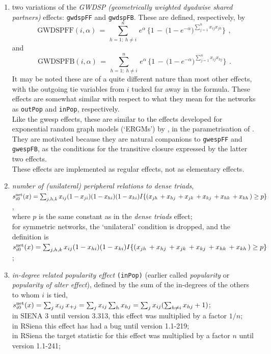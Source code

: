 \documentclass[a4paper,fleqn,11pt]{article}
\newcommand{\+}{\, + \,}
\newcommand{\RS}{{\sf RSiena }}
\newcommand{\SI}{{\sf SIENA }}
\newcommand{\vit}{\theenumi}
\begin{document}
\begin{enumerate}
\item two variations of the
   \emph{GWDSP (geometrically weighted dyadwise shared partners)} effects:
   \texttt{gwdspFF} and \texttt{gwdspFB}.
   These are defined, respectively, by
\begin{equation}
  \text{GWDSPFF}(i, \alpha) \,=\,
       \sum_{h=1;\; h \neq i}^n \, e^{\alpha} \,\Big\{1 \,-\, \big(1 -
   e^{-\alpha}\big)^{\sum_{j=1}^n x_{ij}x_{jh} }  \Big\}    \,   \ ,
\end{equation}
and
\begin{equation}
  \text{GWDSPFB}(i, \alpha) \,=\,
       \sum_{h=1;\; h \neq i}^n \, e^{\alpha} \,\Big\{1 \,-\, \big(1 -
   e^{-\alpha}\big)^{\sum_{j=1}^n x_{ij}x_{hj} }  \Big\}    \,   \ .
\end{equation}
   It may be noted these are of a quite different nature than most other effects,
   with the outgoing tie variables from $i$ tucked far away in the formula.
   These effects are somewhat similar with respect to what they mean for the
   networks as \texttt{outPop} and \texttt{inPop}, respectively.\\
   Like the gwesp effects, these are similar to the effects developed for
   exponential random graph models (`ERGMs')
   by \citet{SPRH06}, in the parametrisation of \citet{Hunter2007}.
   They are motivated because they are natural companions to \texttt{gwespFF}
   and \texttt{gwespFB}, as the conditions for the transitive closure
   expressed by the latter two effects.\\
   These effects are implemented as regular effects, not as elementary effects.

 \item {\em number of (unilateral) peripheral relations to dense triads},\\
 $s^{\rm net}_{i\vit}(x) =  \sum_{j,h,k} x_{ij} (1-x_{ji})(1-x_{hi})(1-x_{ki})
 I\{ (x_{jh}\,  + x_{hj}\, + x_{jk}\, + x_{kj}\, + x_{hk}\, + x_{kh}\,)\geq p \} \,$,\\
 where $p$ is the same constant as in the {\it dense triads} effect;\\
 for symmetric networks, the `unilateral' condition is dropped, and the definition is\\
 $s^{\rm net}_{i\vit}(x) =  \sum_{j,h,k} x_{ij} (1-x_{hi})(1-x_{ki})
 I\{ (x_{jh}\,  + x_{hj}\, + x_{jk}\, + x_{kj}\, + x_{hk}\, + x_{kh}\,)\geq p \} \,$;



 \item {\em in-degree related popularity effect} \texttt{(inPop)}
 (earlier called {\em popularity} or {\em popularity of alter effect}), defined by
  the sum of
 the in-degrees of the others to whom $i$ is tied,\\
 $s^{\rm net}_{i\vit}(x) =  \sum_j x_{ij}\, x_{+j} =
 \sum_j x_{ij} \sum_h x_{hj} = \sum_j x_{ij} (\sum_{h \neq i} x_{hj} + 1)$;\\
 in \SI 3 until version 3.313, this effect was multiplied by a factor $1/n$;\\
 in \RS this effect has had a bug until version 1.1-219;\\
 in \RS the target statistic for this effect was multiplied by a factor $n$ until version 1.1-241;


\end{enumerate}
\end{document}
